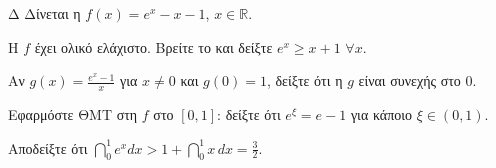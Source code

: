 \begin{thema}{Δ}
Δίνεται η $f(x)=e^x-x-1$, $x\in\mathbb{R}$.
\begin{erwthma}
    \item Η $f$ έχει ολικό ελάχιστο. Βρείτε το και δείξτε $e^x \geq x+1$ $\forall x$. 
    \item Αν $g(x) = \frac{e^x-1}{x}$ για $x\neq 0$ και $g(0)=1$, δείξτε ότι η $g$ είναι συνεχής στο $0$. 
    \item Εφαρμόστε ΘΜΤ στη $f$ στο $[0,1]$: δείξτε ότι $e^\xi = e-1$ για κάποιο $\xi\in(0,1)$. 
    \item Αποδείξτε ότι $\dint_0^1 e^x dx > 1 + \dint_0^1 x\,dx = \frac{3}{2}$. 
\end{erwthma}
\end{thema}
